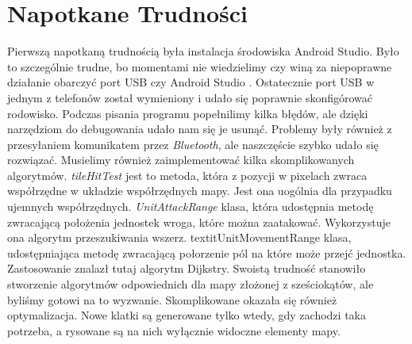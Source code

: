 \documentclass[paper=a4, fontsize=11pt]{scrartcl} %
\numberwithin{equation}{section} %
\numberwithin{figure}{section} %
\numberwithin{table}{section} %
\begin{document}
\section{Napotkane Trudności}
Pierwszą napotkaną trudnością była instalacja środowiska Android Studio. Było to szczególnie trudne, bo momentami nie wiedzielimy czy winą za niepoprawne działanie obarczyć port USB czy Android Studio . Ostatecznie port USB w jednym z telefonów został wymieniony i udało się poprawnie skonfigórować rodowisko. Podczas pisania programu popełnilimy kilka błędów, ale dzięki narzędziom do debugowania udało nam się je usunąć. Problemy były również z przesyłaniem komunikatem przez \textit{Bluetooth}, ale naszczęście szybko udało się rozwiązać. Musielimy również zaimplementować kilka skomplikowanych algorytmów. \textit{tileHitTest} jest to metoda, która z pozycji w pixelach zwraca współrzędne w układzie współrzędnych mapy. Jest ona uogólnia dla przypadku ujemnych współrzędnych. \textit{UnitAttackRange} klasa, która udostępnia metodę zwracającą położenia jednostek wroga, które można zaatakować. Wykorzystuje ona algorytm przeszukiwania wszerz.  textit{UnitMovementRange} klasa, udostępniająca metodę zwracającą połorzenie pól na które może przejć jednostka. Zastosowanie znalazł tutaj algorytm Dijkstry. Swoistą trudność stanowiło stworzenie algorytmów odpowiednich dla mapy złożonej z sześciokątów, ale byliśmy gotowi na to wyzwanie. Skomplikowane okazała się również optymalizacja. Nowe klatki są generowane tylko wtedy, gdy zachodzi taka potrzeba, a rysowane są na nich wyłącznie widoczne elementy mapy.

\end{document}
